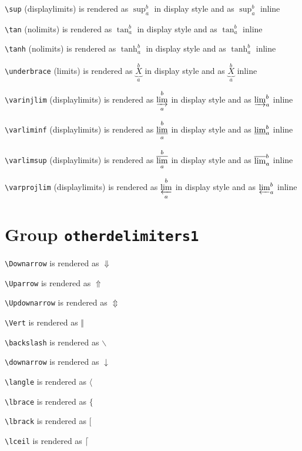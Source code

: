 \texttt{\textbackslash sup} (displaylimits) is rendered as $\displaystyle \sup_a^b$ in display style and as $\sup_a^b$ inline

\texttt{\textbackslash tan} (nolimits) is rendered as $\displaystyle \tan_a^b$ in display style and as $\tan_a^b$ inline

\texttt{\textbackslash tanh} (nolimits) is rendered as $\displaystyle \tanh_a^b$ in display style and as $\tanh_a^b$ inline

\texttt{\textbackslash underbrace} (limits) is rendered as $\displaystyle \underbrace{X}_a^b$ in display style and as $\underbrace{X}_a^b$ inline

\texttt{\textbackslash varinjlim} (displaylimits) is rendered as $\displaystyle \varinjlim_a^b$ in display style and as $\varinjlim_a^b$ inline

\texttt{\textbackslash varliminf} (displaylimits) is rendered as $\displaystyle \varliminf_a^b$ in display style and as $\varliminf_a^b$ inline

\texttt{\textbackslash varlimsup} (displaylimits) is rendered as $\displaystyle \varlimsup_a^b$ in display style and as $\varlimsup_a^b$ inline

\texttt{\textbackslash varprojlim} (displaylimits) is rendered as $\displaystyle \varprojlim_a^b$ in display style and as $\varprojlim_a^b$ inline

\section{ Group \texttt{other\textunderscore delimiters1}}

\texttt{\textbackslash Downarrow} is rendered as $\Downarrow$

\texttt{\textbackslash Uparrow} is rendered as $\Uparrow$

\texttt{\textbackslash Updownarrow} is rendered as $\Updownarrow$

\texttt{\textbackslash Vert} is rendered as $\Vert$

\texttt{\textbackslash backslash} is rendered as $\backslash$

\texttt{\textbackslash downarrow} is rendered as $\downarrow$

\texttt{\textbackslash langle} is rendered as $\langle$

\texttt{\textbackslash lbrace} is rendered as $\lbrace$

\texttt{\textbackslash lbrack} is rendered as $\lbrack$

\texttt{\textbackslash lceil} is rendered as $\lceil$

